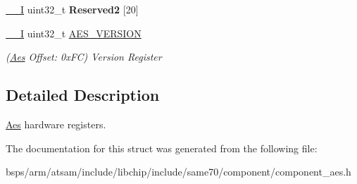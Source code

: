 \begin{DoxyCompactItemize}
\mbox{\hyperlink{core__cm7_8h_af63697ed9952cc71e1225efe205f6cd3}{\+\_\+\+\_\+I}} uint32\+\_\+t {\bfseries Reserved2} \mbox{[}20\mbox{]}
\item 
\mbox{\label{structAes_a5c7a717e58314807ce8c27b3d8df9671}} 
\mbox{\hyperlink{core__cm7_8h_af63697ed9952cc71e1225efe205f6cd3}{\+\_\+\+\_\+I}} uint32\+\_\+t \mbox{\hyperlink{structAes_a5c7a717e58314807ce8c27b3d8df9671}{A\+E\+S\+\_\+\+V\+E\+R\+S\+I\+ON}}
\begin{DoxyCompactList}\small\item\em (\mbox{\hyperlink{structAes}{Aes}} Offset\+: 0x\+FC) Version Register \end{DoxyCompactList}\end{DoxyCompactItemize}


\subsection{Detailed Description}
\mbox{\hyperlink{structAes}{Aes}} hardware registers. 

The documentation for this struct was generated from the following file\+:\begin{DoxyCompactItemize}
\item 
bsps/arm/atsam/include/libchip/include/same70/component/component\+\_\+aes.\+h\end{DoxyCompactItemize}
